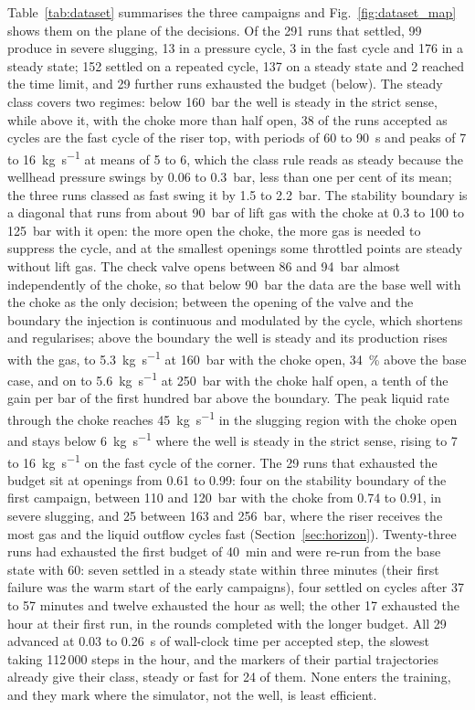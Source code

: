 \documentclass[a4paper,fleqn]{cas-sc}
\begin{document}
Table~\ref{tab:dataset} summarises the three campaigns and Fig.~\ref{fig:dataset_map} shows them on the plane of the decisions. Of the 291 runs that settled, 99 produce in severe slugging, 13 in a pressure cycle, 3 in the fast cycle and 176 in a steady state; 152 settled on a repeated cycle, 137 on a steady state and 2 reached the time limit, and 29 further runs exhausted the budget (below). The steady class covers two regimes: below \SI{160}{\bar} the well is steady in the strict sense, while above it, with the choke more than half open, 38 of the runs accepted as cycles are the fast cycle of the riser top, with periods of 60 to \SI{90}{\second} and peaks of 7 to \SI{16}{\kilogram\per\second} at means of 5 to 6, which the class rule reads as steady because the wellhead pressure swings by 0.06 to \SI{0.3}{\bar}, less than one per cent of its mean; the three runs classed as fast swing it by 1.5 to \SI{2.2}{\bar}. The stability boundary is a diagonal that runs from about \SI{90}{\bar} of lift gas with the choke at 0.3 to 100 to \SI{125}{\bar} with it open: the more open the choke, the more gas is needed to suppress the cycle, and at the smallest openings some throttled points are steady without lift gas. The check valve opens between 86 and \SI{94}{\bar} almost independently of the choke, so that below \SI{90}{\bar} the data are the base well with the choke as the only decision; between the opening of the valve and the boundary the injection is continuous and modulated by the cycle, which shortens and regularises; above the boundary the well is steady and its production rises with the gas, to \SI{5.3}{\kilogram\per\second} at \SI{160}{\bar} with the choke open, \SI{34}{\percent} above the base case, and on to \SI{5.6}{\kilogram\per\second} at \SI{250}{\bar} with the choke half open, a tenth of the gain per bar of the first hundred bar above the boundary. The peak liquid rate through the choke reaches \SI{45}{\kilogram\per\second} in the slugging region with the choke open and stays below \SI{6}{\kilogram\per\second} where the well is steady in the strict sense, rising to 7 to \SI{16}{\kilogram\per\second} on the fast cycle of the corner. The 29 runs that exhausted the budget sit at openings from 0.61 to 0.99: four on the stability boundary of the first campaign, between 110 and \SI{120}{\bar} with the choke from 0.74 to 0.91, in severe slugging, and 25 between 163 and \SI{256}{\bar}, where the riser receives the most gas and the liquid outflow cycles fast (Section~\ref{sec:horizon}). Twenty-three runs had exhausted the first budget of \SI{40}{\minute} and were re-run from the base state with 60: seven settled in a steady state within three minutes (their first failure was the warm start of the early campaigns), four settled on cycles after 37 to 57 minutes and twelve exhausted the hour as well; the other 17 exhausted the hour at their first run, in the rounds completed with the longer budget. All 29 advanced at 0.03 to \SI{0.26}{\second} of wall-clock time per accepted step, the slowest taking 112\,000 steps in the hour, and the markers of their partial trajectories already give their class, steady or fast for 24 of them. None enters the training, and they mark where the simulator, not the well, is least efficient.
\end{document}
